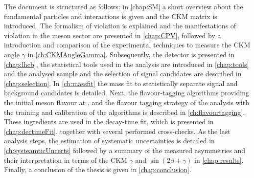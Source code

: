 The document is structured as follows:
in \cref{chap:SM} a short overview about the fundamental particles and interactions is given and the CKM matrix is introduced.
The formalism of \CP violation is explained and the manifestations of \CP violation in the \B meson sector are presented in \cref{chap:CPV}, followed by a introduction and comparison of the experimental techniques to measure the CKM angle $\gamma$  in \cref{ch:CKMAngleGamma}.
Subsequently, the \lhcb detector is presented in \cref{chap:lhcb}, the statistical tools used in the analysis are introduced in \cref{chap:tools} and the analysed sample and the selection of signal candidates are described in \cref{chap:selection}.
In \cref{ch:massfit} the mass fit to statistically separate signal and background candidates is detailed.
Next, the flavour-tagging algorithms providing the initial \B meson flavour at \lhcb, and the flavour tagging strategy of the analysis with the training and calibration of the algorithms is described in \cref{ch:flavourtagging}.
These ingredients are used in the decay-time fit, which is presented in \cref{chap:dectimeFit}, together with several performed cross-checks.
As the last analysis steps, the estimation of systematic uncertainties is detailed in \cref{ch:systeamticUncerts} followed by a summary of the measured \CP asymmetries and their interpretation in terms of the CKM $\gamma$ and $\sin\!\left(2\beta+\gamma\right)$ in \cref{chap:results}.
Finally, a conclusion of the thesis is given in \cref{chap:conclusion}.
